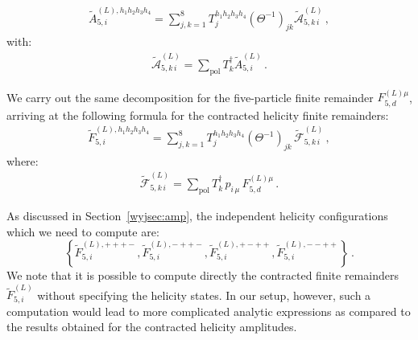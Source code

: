 \documentclass[main.tex]{subfiles}
\begin{document}
\begin{align}
\label{Wyjeq:A5Ldef}
\tilde{A}_{5,i}^{(L),h_1 h_2 h_3 h_4} = \sum_{j,k=1}^{8} T_{j}^{h_1 h_2 h_3 h_4} \left(\Theta^{-1}\right)_{jk} \tilde{\mathcal{A}}_{5,k \, i}^{(L)} \,,
\end{align}
with:
\begin{align} \label{Wyjeq:Asumpol}
\tilde{\mathcal{A}}_{5,k \, i}^{(L)}  = \sum_{\text{pol}} {T}_{k}^\dagger \tilde{A}_{5,i}^{(L)} \,.
\end{align}

We carry out the same decomposition for the five-particle finite remainder $F_{5,d}^{(L)\mu}$, arriving at the following formula for the contracted helicity finite remainders:
\begin{align}
\label{Wyjeq:FA5Ldef}
\tilde{F}_{5,i}^{(L),h_1 h_2 h_3 h_4} = \sum_{j,k=1}^{8} T_{j}^{h_1 h_2 h_3 h_4} \left(\Theta^{-1}\right)_{jk}  \, \tilde{\mathcal{F}}_{5,k \, i}^{(L)}\,,
\end{align}
where:
\begin{align} \label{Wyjeq:FA5Ldefpt2}
\tilde{\mathcal{F}}_{5,k \, i}^{(L)}  = \sum_{\text{pol}} {T}_{k}^\dagger  \, p_{i \, \mu} \, F_{5,d}^{(L) \mu}  \,.
\end{align}

As discussed in Section~\ref{wyjsec:amp}, the independent helicity configurations which we need to compute are:
\begin{equation} \label{Wyjeq:indephel}
\left\{
\tilde{F}_{5,i}^{(L),+++-}, 
\tilde{F}_{5,i}^{(L),-++-}, 
\tilde{F}_{5,i}^{(L),+-++}, 
\tilde{F}_{5,i}^{(L),--++}
\right\} \,.
\end{equation}
We note that it is possible to compute directly the contracted finite remainders $\tilde{F}^{(L)}_{5,i}$ without specifying the helicity states. In our setup, however, such a computation would lead to more complicated analytic expressions as compared to the results obtained for the contracted helicity amplitudes. 
\end{document}
